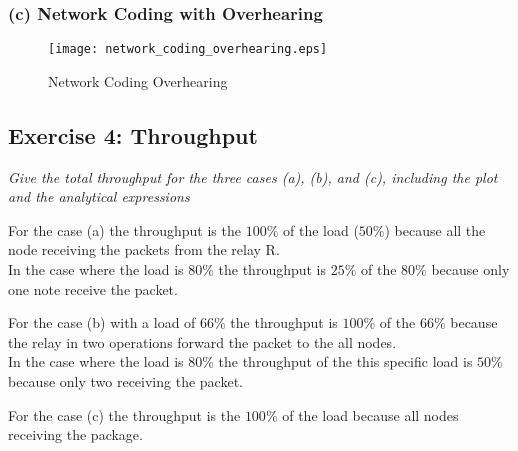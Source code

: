 \subsubsection{(c) Network Coding with Overhearing}
\begin{figure}[!h]
  \centering
  \texttt{[image: network\_coding\_overhearing.eps]}
  \caption{Network Coding Overhearing}
  \label{fig:network_coding_overhearing}
\end{figure}

\subsection{Exercise 4: Throughput}
\textit{Give the total throughput for the three cases (a), (b), and (c), including the plot and the analytical expressions}\\
\begin{pitemize}
\item For the case (a) the throughput is the $100 \%$ of the load ($50 \%$) because all the node receiving the packets from the relay R. \\In the case where the load is $80 \%$ the throughput is $25 \%$ of the $80 \%$ because only one note receive the packet.
\item For the case (b) with a load of $66\%$ the throughput is $100 \%$ of the $66\%$ because the relay in two operations forward the packet to the all nodes. \\ In the case where the load is $80 \%$ the throughput of the this specific load is $50 \%$ because only two receiving the packet.
\item For the case (c) the throughput is the $100 \%$ of the load because all nodes receiving the package. 
\end{pitemize}
